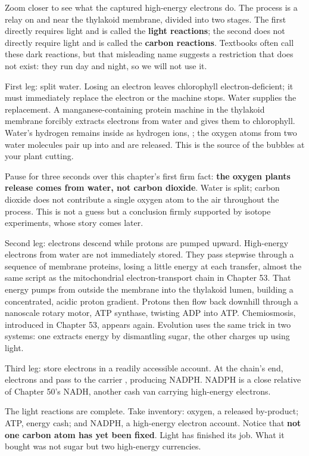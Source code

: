 Zoom closer to see what the captured high-energy electrons do. The process is a relay on and near the thylakoid membrane, divided into two stages. The first directly requires light and is called the \textbf{light reactions}; the second does not directly require light and is called the \textbf{carbon reactions}. Textbooks often call these dark reactions, but that misleading name suggests a restriction that does not exist: they run day and night, so we will not use it.

First leg: split water. Losing an electron leaves chlorophyll electron-deficient; it must immediately replace the electron or the machine stops. Water supplies the replacement. A manganese-containing protein machine in the thylakoid membrane forcibly extracts electrons from water and gives them to chlorophyll. Water's hydrogen remains inside as hydrogen ions, ; the oxygen atoms from two water molecules pair up into  and are released. This is the source of the bubbles at your plant cutting.

Pause for three seconds over this chapter's first firm fact: \textbf{the oxygen plants release comes from water, not carbon dioxide}. Water is split; carbon dioxide does not contribute a single oxygen atom to the air throughout the process. This is not a guess but a conclusion firmly supported by isotope experiments, whose story comes later.

Second leg: electrons descend while protons are pumped upward. High-energy electrons from water are not immediately stored. They pass stepwise through a sequence of membrane proteins, losing a little energy at each transfer, almost the same script as the mitochondrial electron-transport chain in Chapter 53. That energy pumps  from outside the membrane into the thylakoid lumen, building a concentrated, acidic proton gradient. Protons then flow back downhill through a nanoscale rotary motor, ATP synthase, twisting ADP into ATP. Chemiosmosis, introduced in Chapter 53, appears again. Evolution uses the same trick in two systems: one extracts energy by dismantling sugar, the other charges up using light.

Third leg: store electrons in a readily accessible account. At the chain's end, electrons and  pass to the carrier , producing NADPH. NADPH is a close relative of Chapter 50's NADH, another cash van carrying high-energy electrons.

The light reactions are complete. Take inventory: oxygen, a released by-product; ATP, energy cash; and NADPH, a high-energy electron account. Notice that \textbf{not one carbon atom has yet been fixed}. Light has finished its job. What it bought was not sugar but two high-energy currencies.

